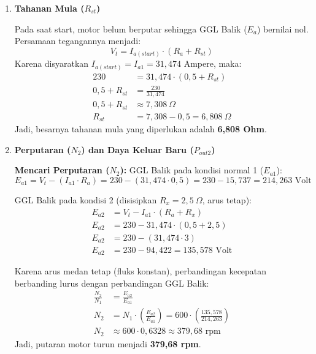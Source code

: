 \documentclass[12pt, a4paper]{article}
\begin{document}
\begin{enumerate}[label=\alph*.]
    \item \textbf{Tahanan Mula ($R_{st}$)}

    Pada saat start, motor belum berputar sehingga GGL Balik ($E_a$) bernilai nol. Persamaan tegangannya menjadi:
    \[
        V_t = I_{a(start)} \cdot (R_a + R_{st})
    \]
    Karena disyaratkan $I_{a(start)} = I_{a1} = 31,474$ Ampere, maka:
    \begin{align*}
        230 &= 31,474 \cdot (0,5 + R_{st}) \\
        0,5 + R_{st} &= \frac{230}{31,474} \\
        0,5 + R_{st} &\approx 7,308 \ \Omega \\
        R_{st} &= 7,308 - 0,5 = 6,808 \ \Omega
    \end{align*}
    Jadi, besarnya tahanan mula yang diperlukan adalah \textbf{6,808 Ohm}.

    \item \textbf{Perputaran ($N_2$) dan Daya Keluar Baru ($P_{out2}$)}

    \textbf{Mencari Perputaran ($N_2$):}
    GGL Balik pada kondisi normal 1 ($E_{a1}$):
    \[
        E_{a1} = V_t - (I_{a1} \cdot R_a) = 230 - (31,474 \cdot 0,5) = 230 - 15,737 = 214,263 \text{ Volt}
    \]

    GGL Balik pada kondisi 2 (disisipkan $R_x = 2,5 \ \Omega$, arus tetap):
    \begin{align*}
        E_{a2} &= V_t - I_{a1} \cdot (R_a + R_x) \\
        E_{a2} &= 230 - 31,474 \cdot (0,5 + 2,5) \\
        E_{a2} &= 230 - (31,474 \cdot 3) \\
        E_{a2} &= 230 - 94,422 = 135,578 \text{ Volt}
    \end{align*}

    Karena arus medan tetap (fluks konstan), perbandingan kecepatan berbanding lurus dengan perbandingan GGL Balik:
    \begin{align*}
        \frac{N_2}{N_1} &= \frac{E_{a2}}{E_{a1}} \\
        N_2 &= N_1 \cdot \left(\frac{E_{a2}}{E_{a1}}\right) = 600 \cdot \left(\frac{135,578}{214,263}\right) \\
        N_2 &\approx 600 \cdot 0,6328 \approx 379,68 \text{ rpm}
    \end{align*}
    Jadi, putaran motor turun menjadi \textbf{379,68 rpm}.

    \vspace{0.2cm}


\end{enumerate}
\end{document}

